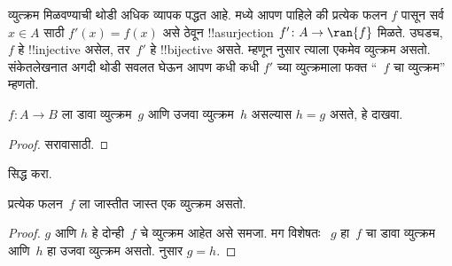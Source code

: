 \documentclass[../../../include/open-logic-section]{subfiles}
\begin{document}
\begin{explain}
व्युत्क्रम मिळवण्याची थोडी अधिक व्यापक पद्धत आहे. 
मध्ये आपण पाहिले की प्रत्येक फलन $f$ पासून सर्व $x \in A$ साठी
$f'(x) = f(x)$ असे ठेवून !!a{surjection} $f' \colon A \to \ran{f}$
मिळते. उघडच, ~$f$ हे !!{injective} असेल, तर~$f'$ हे !!{bijective}
असते. म्हणून  नुसार त्याला एकमेव
व्युत्क्रम असतो. संकेतलेखनात अगदी थोडी सवलत घेऊन आपण कधी कधी
$f'$ च्या व्युत्क्रमाला फक्त ``~$f$ चा व्युत्क्रम'' म्हणतो.
\end{explain}

\begin{prop}%
  $f\colon A \to B$ ला डावा व्युत्क्रम~$g$ आणि उजवा व्युत्क्रम~$h$
  असल्यास $h = g$ असते, हे दाखवा.
\end{prop}

\begin{proof}
  सरावासाठी.
\end{proof}

\begin{prob}
   सिद्ध करा.
\end{prob}

\begin{prop}
प्रत्येक फलन~$f$ ला जास्तीत जास्त एक व्युत्क्रम असतो.
\end{prop}

\begin{proof}
  $g$ आणि $h$ हे दोन्ही~$f$ चे व्युत्क्रम आहेत असे समजा. मग विशेषतः
  ~$g$ हा~$f$ चा डावा व्युत्क्रम आणि~$h$ हा उजवा व्युत्क्रम असतो.
   नुसार $g = h$.
\end{proof}
\end{document}
